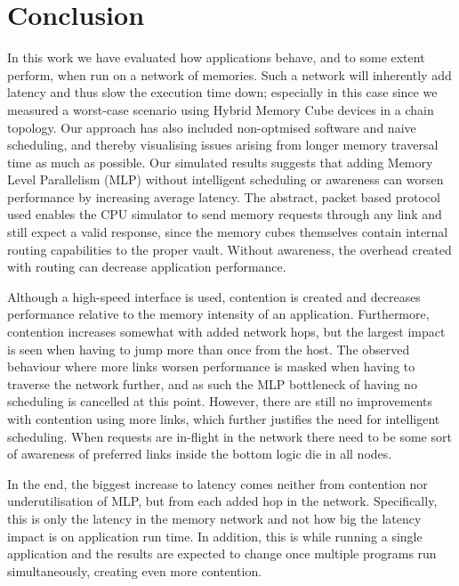 \chapter{Conclusion}
In this work we have evaluated how applications behave, and to some extent perform, when run on a network of memories. Such a network will inherently add latency and thus slow the execution time down; especially in this case since we measured a worst-case scenario using Hybrid Memory Cube devices in a chain topology. Our approach has also included non-optmised software and naive scheduling, and thereby visualising issues arising from longer memory traversal time as much as possible. Our simulated results suggests that adding Memory Level Parallelism (MLP) without intelligent scheduling or awareness can worsen performance by increasing average latency. The abstract, packet based protocol used enables the CPU simulator to send memory requests through any link and still expect a valid response, since the memory cubes themselves contain internal routing capabilities to the proper vault. Without awareness, the overhead created with routing can decrease application performance. 
\bigskip

Although a high-speed interface is used, contention is created and decreases performance relative to the memory intensity of an application. Furthermore, contention increases somewhat with added network hops, but the largest impact is seen when having to jump more than once from the host. The observed behaviour where more links worsen performance is masked when having to traverse the network further, and as such the MLP bottleneck of having no scheduling is cancelled at this point. However, there are still no improvements with contention using more links, which further justifies the need for intelligent scheduling. When requests are in-flight in the network there need to be some sort of awareness of preferred links inside the bottom logic die in all nodes. 
\bigskip

In the end, the biggest increase to latency comes neither from contention nor underutilisation of MLP, but from each added hop in the network. Specifically, this is only the latency in the memory network and not how big the latency impact is on application run time. In addition, this is while running a single application and the results are expected to change once multiple programs run simultaneously, creating even more contention.
